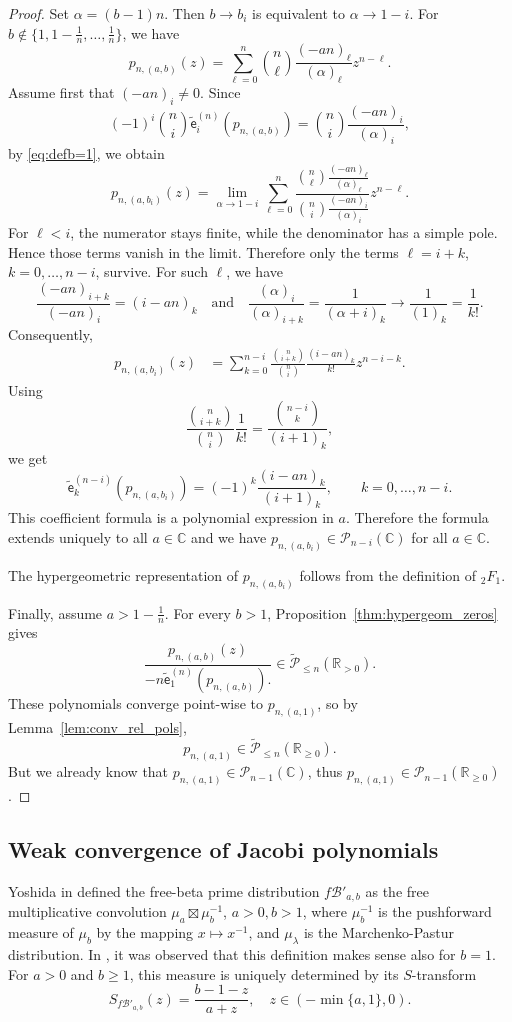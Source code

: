 \documentclass[a4paper,11pt]{amsart}
\numberwithin{equation}{section}
\newcommand{\C}{\mathbb{C}}
\newcommand{\R}{\mathbb{R}}
\newcommand{\pols}{\mathcal P}
\newcommand{\falling}[2]{\left(#1\right)_{#2}}
\newcommand{\coef}[2]{\widetilde{\mathsf{e}}_{#1}^{(#2)}} %
\begin{document}
\begin{proof}
Set $\alpha=(b-1)n$. 
Then \(b\to b_i\) is equivalent to $\alpha\to 1-i$.
For \(b\notin \{1,1-\frac1n,\ldots,\frac1n\}\), we have
\[
p_{n,(a,b)}(z)
=
\sum_{\ell=0}^n
\binom{n}{\ell}
\frac{(-an)_\ell}{(\alpha)_\ell}
z^{n-\ell}.
\]
Assume first that \((-an)_i\neq0\). 
Since
\[
(-1)^i\binom{n}{i}\coef{i}{n}\!\left(p_{n,(a,b)}\right)
=
\binom{n}{i}\frac{(-an)_i}{(\alpha)_i},
\]
by \eqref{eq:defb=1}, we obtain
\[
p_{n,(a,b_i)}(z)
=
\lim_{\alpha\to 1-i}
\sum_{\ell=0}^n
\frac{
\binom{n}{\ell}\frac{(-an)_\ell}{(\alpha)_\ell}
}{
\binom{n}{i}\frac{(-an)_i}{(\alpha)_i}
}
z^{n-\ell}.
\]
For \(\ell<i\), the numerator stays finite, while the denominator has a simple
pole. Hence those terms vanish in the limit. Therefore only the terms
\(\ell=i+k\), \(k=0,\ldots,n-i\), survive. For such \(\ell\), we have
\[
\frac{(-an)_{i+k}}{(-an)_i}=(i-an)_k\quad\mbox{and}\quad 
\frac{(\alpha)_i}{(\alpha)_{i+k}}
=
\frac{1}{(\alpha+i)_k}
\longrightarrow
\frac1{(1)_k}
=
\frac1{k!}.
\]
Consequently,
\begin{align*}
p_{n,(a,b_i)}(z)
&=
\sum_{k=0}^{n-i}
\frac{\binom{n}{i+k}}{\binom{n}{i}}
\frac{(i-an)_k}{k!}
z^{n-i-k}.
\end{align*}
Using
\[
\frac{\binom{n}{i+k}}{\binom{n}{i}}\frac1{k!}
=
\frac{\binom{n-i}{k}}{(i+1)_k},
\]
we get
\[
\coef{k}{n-i}\!\left(p_{n,(a,b_i)}\right)
=(-1)^k
\frac{\falling{i-an}{k}}{(i+1)_k},
\qquad k=0,\ldots,n-i.
\]
This coefficient formula is a polynomial expression in \(a\). Therefore the formula extends
uniquely to all \(a\in\C\) and we have $p_{n,(a,b_i)}\in\pols_{n-i}(\C)$ for all $a\in\C$. 

The hypergeometric representation of $p_{n,(a,b_i)}$ follows from the definition of ${}_2F_1$.

Finally, assume \(a>1-\frac1n\). For every \(b>1\), Proposition~\ref{thm:hypergeom_zeros} gives 
\[ 
\frac{
p_{n,(a,b)}(z)
}{
-n\coef{1}{n}(p_{n,(a,b)}).
}\in \tilde{\pols}_{\le n}(\R_{>0}). 
\] These polynomials converge point-wise to \(p_{n,(a,1)}\), so by Lemma~\ref{lem:conv_rel_pols}, \[ p_{n,(a,1)}\in \tilde{\pols}_{\le n}(\R_{\ge0}). \] But we already know that $p_{n,(a,1)}\in \pols_{n-1}(\C)$, thus $p_{n,(a,1)}\in \pols_{n-1}(\R_{\geq 0})$.
\end{proof}


\subsection{Weak convergence of Jacobi polynomials}\label{sec:WeakConvJacobi}
Yoshida in \cite{Yoshida} defined the free-beta prime distribution $f\mathcal{B}'_{a,b}$ as the free multiplicative convolution $\mu_a\boxtimes \mu_b^{-1}$, $a>0, b>1$, where $\mu_b^{-1}$ is the pushforward measure of $\mu_b$ by the mapping $x\mapsto x^{-1}$, and $\mu_\lambda$ is the Marchenko-Pastur distribution. In \cite{FreePerp}, it was observed that this definition makes sense also for $b=1$. 
For $a>0$ and $b\geq 1$, this measure is uniquely determined by its $S$-transform 
 \[
 S_{f\mathcal{B}'_{a,b}}(z)=\frac{b-1-z}{a+z},\quad z\in(-\min\{a,1\},0). 
 \]
\end{document}
